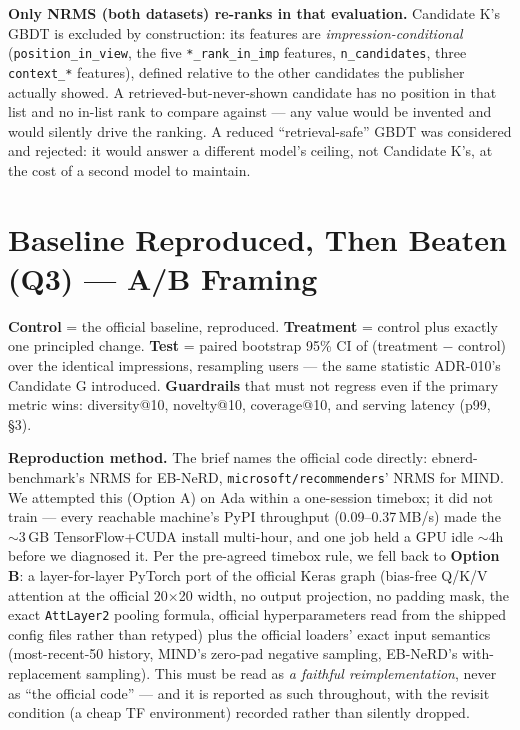 \documentclass[11pt]{article}
\begin{document}
\textbf{Only NRMS (both datasets) re-ranks in that evaluation.} Candidate K's GBDT
is excluded by construction: its features are \emph{impression-conditional}
(\texttt{position\_in\_view}, the five \texttt{*\_rank\_in\_imp} features,
\texttt{n\_candidates}, three \texttt{context\_*} features), defined relative to the
other candidates the publisher actually showed. A retrieved-but-never-shown
candidate has no position in that list and no in-list rank to compare against ---
any value would be invented and would silently drive the ranking. A reduced
``retrieval-safe'' GBDT was considered and rejected: it would answer a different
model's ceiling, not Candidate K's, at the cost of a second model to maintain.

\section{Baseline Reproduced, Then Beaten (Q3) --- A/B Framing}

\textbf{Control} = the official baseline, reproduced. \textbf{Treatment} = control
plus exactly one principled change. \textbf{Test} = paired bootstrap 95\% CI of
(treatment $-$ control) over the identical impressions, resampling users --- the
same statistic ADR-010's Candidate G introduced. \textbf{Guardrails} that must not
regress even if the primary metric wins: diversity@10, novelty@10, coverage@10, and
serving latency (p99, \S3).

\textbf{Reproduction method.} The brief names the official code directly:
ebnerd-benchmark's NRMS for EB-NeRD, \texttt{microsoft/recommenders}' NRMS for MIND.
We attempted this (Option A) on Ada within a one-session timebox; it did not train
--- every reachable machine's PyPI throughput (0.09--0.37\,MB/s) made the $\sim$3\,GB
TensorFlow+CUDA install multi-hour, and one job held a GPU idle $\sim$4h before we
diagnosed it. Per the pre-agreed timebox rule, we fell back to \textbf{Option B}: a
layer-for-layer PyTorch port of the official Keras graph (bias-free Q/K/V attention
at the official 20$\times$20 width, no output projection, no padding mask, the exact
\texttt{AttLayer2} pooling formula, official hyperparameters read from the shipped
config files rather than retyped) plus the official loaders' exact input semantics
(most-recent-50 history, MIND's zero-pad negative sampling, EB-NeRD's
with-replacement sampling). This must be read as \emph{a faithful reimplementation},
never as ``the official code'' --- and it is reported as such throughout, with the
revisit condition (a cheap TF environment) recorded rather than silently dropped.
\end{document}

